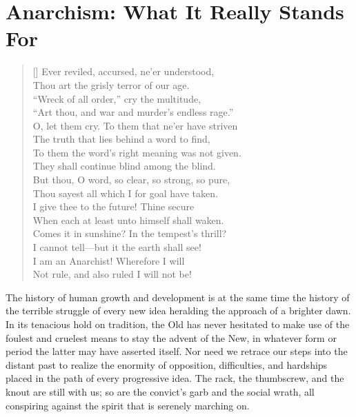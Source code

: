 
\author{Emma Goldman}
\chapter{Anarchism: What It Really Stands For}


\settowidth{}
\begin{verse}[\versewidth]
Ever reviled, accursed, ne'er understood,\\
\vin Thou art the grisly terror of our age.\\
``Wreck of all order,'' cry the multitude,\\
\vin ``Art thou, and war and murder's endless rage.''\\
O, let them cry. To them that ne'er have striven\\
\vin The truth that lies behind a word to find,\\
To them the word's right meaning was not given.\\
\vin They shall continue blind among the blind.\\
But thou, O word, so clear, so strong, so pure,\\
\vin Thou sayest all which I for goal have taken.\\
I give thee to the future! Thine secure\\
\vin When each at least unto himself shall waken.\\
Comes it in sunshine? In the tempest's thrill?\\
\vin I cannot tell---but it the earth shall see!\\
I am an Anarchist! Wherefore I will\\
\vin Not rule, and also ruled I will not be!\\
\end{verse}

\noindent The history of human growth and development is at the same
time the history of the terrible struggle of every new idea heralding
the approach of a brighter dawn. In its tenacious hold on tradition,
the Old  has never hesitated to make use of the foulest and
cruelest means to stay the advent of the New, in whatever form or
period the latter may have asserted itself. Nor need we retrace our
steps into the distant past to realize the enormity of opposition,
difficulties, and hardships placed in the path of every progressive
idea. The rack, the thumbscrew, and the knout are still with us; so
are the convict's garb and the social wrath, all conspiring against
the spirit that is serenely marching on.

